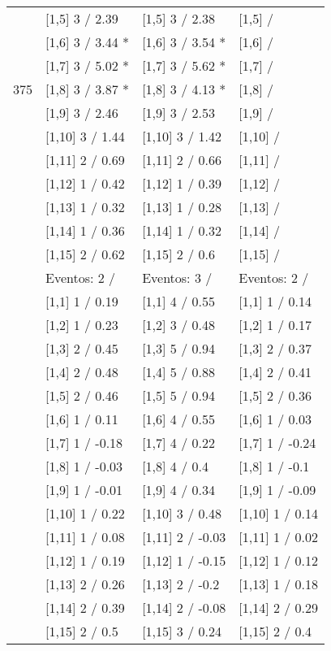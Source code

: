 \begin{table}
\begin{tabular}[t]{llll}
 & {}[1,5] 3  / 2.39 & {}[1,5] 3  / 2.38 & {}[1,5]  /\\
 & {}[1,6] 3  / 3.44 * & {}[1,6] 3  / 3.54 * & {}[1,6]  /\\
 & {}[1,7] 3  / 5.02 * & {}[1,7] 3  / 5.62 * & {}[1,7]  /\\
375 & {}[1,8] 3  / 3.87 * & {}[1,8] 3  / 4.13 * & {}[1,8]  /\\
\addlinespace
 & {}[1,9] 3  / 2.46 & {}[1,9] 3  / 2.53 & {}[1,9]  /\\
 & {}[1,10] 3  / 1.44 & {}[1,10] 3  / 1.42 & {}[1,10]  /\\
 & {}[1,11] 2  / 0.69 & {}[1,11] 2  / 0.66 & {}[1,11]  /\\
 & {}[1,12] 1  / 0.42 & {}[1,12] 1  / 0.39 & {}[1,12]  /\\
 & {}[1,13] 1  / 0.32 & {}[1,13] 1  / 0.28 & {}[1,13]  /\\
\addlinespace
 & {}[1,14] 1  / 0.36 & {}[1,14] 1  / 0.32 & {}[1,14]  /\\
 & {}[1,15] 2  / 0.62 & {}[1,15] 2  / 0.6 & {}[1,15]  /\\
 & Eventos:  2 / & Eventos:  3 / & Eventos:  2 /\\
 & {}[1,1] 1  / 0.19 & {}[1,1] 4  / 0.55 & {}[1,1] 1  / 0.14\\
 & {}[1,2] 1  / 0.23 & {}[1,2] 3  / 0.48 & {}[1,2] 1  / 0.17\\
\addlinespace
 & {}[1,3] 2  / 0.45 & {}[1,3] 5  / 0.94 & {}[1,3] 2  / 0.37\\
 & {}[1,4] 2  / 0.48 & {}[1,4] 5  / 0.88 & {}[1,4] 2  / 0.41\\
 & {}[1,5] 2  / 0.46 & {}[1,5] 5  / 0.94 & {}[1,5] 2  / 0.36\\
 & {}[1,6] 1  / 0.11 & {}[1,6] 4  / 0.55 & {}[1,6] 1  / 0.03\\
 & {}[1,7] 1  / -0.18 & {}[1,7] 4  / 0.22 & {}[1,7] 1  / -0.24\\
\addlinespace
500 & {}[1,8] 1  / -0.03 & {}[1,8] 4  / 0.4 & {}[1,8] 1  / -0.1\\
 & {}[1,9] 1  / -0.01 & {}[1,9] 4  / 0.34 & {}[1,9] 1  / -0.09\\
 & {}[1,10] 1  / 0.22 & {}[1,10] 3  / 0.48 & {}[1,10] 1  / 0.14\\
 & {}[1,11] 1  / 0.08 & {}[1,11] 2  / -0.03 & {}[1,11] 1  / 0.02\\
 & {}[1,12] 1  / 0.19 & {}[1,12] 1  / -0.15 & {}[1,12] 1  / 0.12\\
\addlinespace
 & {}[1,13] 2  / 0.26 & {}[1,13] 2  / -0.2 & {}[1,13] 1  / 0.18\\
 & {}[1,14] 2  / 0.39 & {}[1,14] 2  / -0.08 & {}[1,14] 2  / 0.29\\
 & {}[1,15] 2  / 0.5 & {}[1,15] 3  / 0.24 & {}[1,15] 2  / 0.4\\
\bottomrule
\end{tabular}
\end{table}

